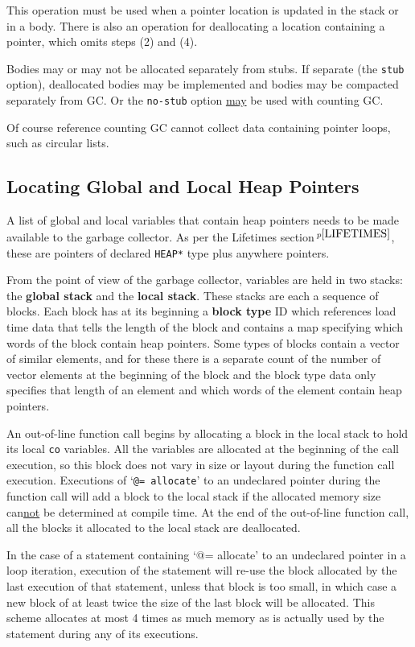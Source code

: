 \documentclass[12pt]{article}
\newcommand{\key}[1]{{\rm \bfseries #1}}
\newcommand{\pagnote}[1]{$\,^{p\pageref{#1}}$}
\begin{document}
This operation must be used when a pointer location is updated
in the stack or in a body.  There is also an operation for
deallocating a location containing a pointer, which omits steps
(2) and (4).

Bodies may or may not be allocated separately from stubs.
If separate (the {\tt stub} option),
deallocated bodies may be implemented and
bodies may be compacted separately from GC.
Or the {\tt no-stub} option \underline{may} be used with
counting GC.

Of course reference counting GC cannot collect data containing
pointer loops, such as circular lists.

\subsection{Locating Global and Local Heap Pointers}

A list of global and local variables that contain heap
pointers needs to be made available to the garbage collector.
As per the Lifetimes section\pagnote{LIFETIMES}, these are
pointers of declared {\tt *HEAP*} type plus anywhere pointers.

From the point of view of the garbage collector, variables
are held in two stacks: the \key{global stack}\label{GLOBAL-STACK} and
the \key{local stack}\label{LOCAL-STACK}.  These
stacks are each a sequence of blocks.  Each block has at its
beginning a \key{block type} ID which references load time data that tells
the length of the block and contains a map specifying which words of the block
contain heap pointers.  Some types of blocks contain a vector
of similar elements, and for these there is a separate count of the number of
vector elements at the beginning of the block and the block type data
only specifies that length of an element and
which words of the element contain heap pointers.

An out-of-line function call\label{OUT-OF-LINE-LOCALS}
begins by allocating a block in the
local stack to hold
its local {\tt co} variables.  All the variables are allocated
at the beginning of the call execution, so this block does not vary
in size or layout during the function call execution.  Executions
of `{\tt @= allocate}' to an undeclared pointer
during the function call will add a block to the
local stack if the allocated memory size can\underline{not} be determined at
compile time.  At the end of the out-of-line function call, all
the blocks it allocated to the local stack are deallocated.

In the case of a statement containing `{@= allocate}' to an undeclared
pointer in a
loop iteration, execution of the statement will re-use the block
allocated by the last execution of that statement, unless that block
is too small, in which case a new block of at least twice the size
of the last block will be allocated.  This scheme allocates at most
4 times as much memory as is actually used by the statement during
any of its executions.
\end{document}
